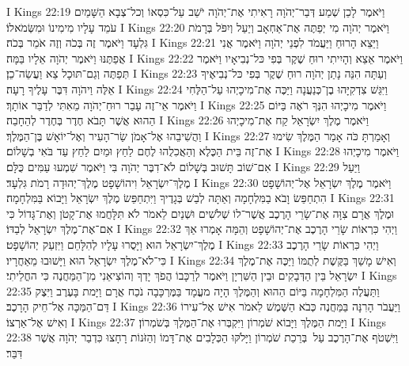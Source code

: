 I Kings 22:19	וַיֹּאמֶר לָכֵן שְׁמַע דְּבַר־יְהֹוָה רָאִיתִי אֶת־יְהֹוָה יֹשֵׁב עַל־כִּסְאוֹ וְכל־צְבָא הַשָּׁמַיִם עֹמֵד עָלָיו מִימִינוֹ וּמִשְּׂמֹאלוֹ׃
I Kings 22:20	וַיֹּאמֶר יְהֹוָה מִי יְפַתֶּה אֶת־אַחְאָב וְיַעַל וְיִפֹּל בְּרָמֹת גִּלְעָד וַיֹּאמֶר זֶה בְּכֹה וְזֶה אֹמֵר בְּכֹה׃
I Kings 22:21	וַיֵּצֵא הָרוּחַ וַיַּעֲמֹד לִפְנֵי יְהֹוָה וַיֹּאמֶר אֲנִי אֲפַתֶּנּוּ וַיֹּאמֶר יְהֹוָה אֵלָיו בַּמָּה׃
I Kings 22:22	וַיֹּאמֶר אֵצֵא וְהָיִיתִי רוּחַ שֶׁקֶר בְּפִי כּל־נְבִיאָיו וַיֹּאמֶר תְּפַתֶּה וְגַם־תּוּכָל צֵא וַעֲשֵׂה־כֵן׃
I Kings 22:23	וְעַתָּה הִנֵּה נָתַן יְהֹוָה רוּחַ שֶׁקֶר בְּפִי כּל־נְבִיאֶיךָ אֵלֶּה וַיהֹוָה דִּבֶּר עָלֶיךָ רָעָה׃
I Kings 22:24	וַיִּגַּשׁ צִדְקִיָּהוּ בֶן־כְּנַעֲנָה וַיַּכֶּה אֶת־מִיכָיְהוּ עַל־הַלֶּחִי וַיֹּאמֶר אֵי־זֶה עָבַר רוּחַ־יְהֹוָה מֵאִתִּי לְדַבֵּר אוֹתָךְ׃
I Kings 22:25	וַיֹּאמֶר מִיכָיְהוּ הִנְּךָ רֹאֶה בַּיּוֹם הַהוּא אֲשֶׁר תָּבֹא חֶדֶר בְּחֶדֶר לְהֵחָבֵה׃
I Kings 22:26	וַיֹּאמֶר מֶלֶךְ יִשְׂרָאֵל קַח אֶת־מִיכָיְהוּ וַהֲשִׁיבֵהוּ אֶל־אָמֹן שַׂר־הָעִיר וְאֶל־יוֹאָשׁ בֶּן־הַמֶּלֶךְ׃
I Kings 22:27	וְאָמַרְתָּ כֹּה אָמַר הַמֶּלֶךְ שִׂימוּ אֶת־זֶה בֵּית הַכֶּלֶא וְהַאֲכִלֻהוּ לֶחֶם לַחַץ וּמַיִם לַחַץ עַד בֹּאִי בְשָׁלוֹם׃
I Kings 22:28	וַיֹּאמֶר מִיכָיְהוּ אִם־שׁוֹב תָּשׁוּב בְּשָׁלוֹם לֹא־דִבֶּר יְהֹוָה בִּי וַיֹּאמֶר שִׁמְעוּ עַמִּים כֻּלָּם׃
I Kings 22:29	וַיַּעַל מֶלֶךְ־יִשְׂרָאֵל וִיהוֹשָׁפָט מֶלֶךְ־יְהוּדָה רָמֹת גִּלְעָד׃
I Kings 22:30	וַיֹּאמֶר מֶלֶךְ יִשְׂרָאֵל אֶל־יְהוֹשָׁפָט הִתְחַפֵּשׂ וָבֹא בַמִּלְחָמָה וְאַתָּה לְבַשׁ בְּגָדֶיךָ וַיִּתְחַפֵּשׂ מֶלֶךְ יִשְׂרָאֵל וַיָּבוֹא בַּמִּלְחָמָה׃
I Kings 22:31	וּמֶלֶךְ אֲרָם צִוָּה אֶת־שָׂרֵי הָרֶכֶב אֲשֶׁר־לוֹ שְׁלֹשִׁים וּשְׁנַיִם לֵאמֹר לֹא תִּלָּחֲמוּ אֶת־קָטֹן וְאֶת־גָּדוֹל כִּי אִם־אֶת־מֶלֶךְ יִשְׂרָאֵל לְבַדּוֹ׃
I Kings 22:32	וַיְהִי כִּרְאוֹת שָׂרֵי הָרֶכֶב אֶת־יְהוֹשָׁפָט וְהֵמָּה אָמְרוּ אַךְ מֶלֶךְ־יִשְׂרָאֵל הוּא וַיָּסֻרוּ עָלָיו לְהִלָּחֵם וַיִּזְעַק יְהוֹשָׁפָט׃
I Kings 22:33	וַיְהִי כִּרְאוֹת שָׂרֵי הָרֶכֶב כִּי־לֹא־מֶלֶךְ יִשְׂרָאֵל הוּא וַיָּשׁוּבוּ מֵאַחֲרָיו׃
I Kings 22:34	וְאִישׁ מָשַׁךְ בַּקֶּשֶׁת לְתֻמּוֹ וַיַּכֶּה אֶת־מֶלֶךְ יִשְׂרָאֵל בֵּין הַדְּבָקִים וּבֵין הַשִּׁרְיָן וַיֹּאמֶר לְרַכָּבוֹ הֲפֹךְ יָדְךָ וְהוֹצִיאֵנִי מִן־הַמַּחֲנֶה כִּי החֳלֵיתִי׃
I Kings 22:35	וַתַּעֲלֶה הַמִּלְחָמָה בַּיּוֹם הַהוּא וְהַמֶּלֶךְ הָיָה מעֳמָד בַּמֶּרְכָּבָה נֹכַח אֲרָם וַיָּמת בָּעֶרֶב וַיִּצֶק דַּם־הַמַּכָּה אֶל־חֵיק הָרָכֶב׃
I Kings 22:36	וַיַּעֲבֹר הָרִנָּה בַּמַּחֲנֶה כְּבֹא הַשֶּׁמֶשׁ לֵאמֹר אִישׁ אֶל־עִירוֹ וְאִישׁ אֶל־אַרְצוֹ׃
I Kings 22:37	וַיָּמת הַמֶּלֶךְ וַיָּבוֹא שֹׁמְרוֹן וַיִּקְבְּרוּ אֶת־הַמֶּלֶךְ בְּשֹׁמְרוֹן׃
I Kings 22:38	וַיִּשְׁטֹף אֶת־הָרֶכֶב עַל  בְּרֵכַת שֹׁמְרוֹן וַיָּלֹקּוּ הַכְּלָבִים אֶת־דָּמוֹ וְהַזֹּנוֹת רָחָצוּ כִּדְבַר יְהֹוָה אֲשֶׁר דִּבֵּר׃
